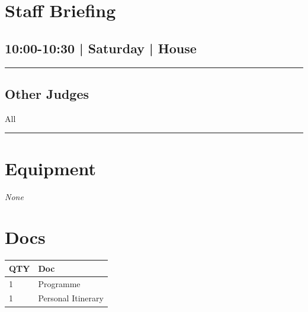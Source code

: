 \documentclass[10pt, A5]{article}
\begin{document}
        \begin{framed}
        \begin{minipage}{\textwidth}

        \setcounter{section}{3}
        \section{Staff Briefing}
        \subsection*{10:00-10:30 | Saturday | House}

        \vspace{0.25cm}
        \hrule
        \vspace{0.25cm}


        \subsection*{Other Judges}
                    All

            \vspace{0.25cm}
        \hrule
        \vspace{0.25cm}

        \begin{multicols}{2}

		\section*{\faWrench \: Equipment}

				\textit{None}
		
		\vfill\null
		\columnbreak

			\section*{\faFile \: Docs}
		 	\begin{center}
			\begin{tabular}{p{2cm}p{4cm}}

			\textbf{QTY} & \textbf{Doc} \\\toprule
										1&Programme\\\midrule
										1&Personal Itinerary\\\midrule
							\end{tabular}
			\end{center}
	

		\vfill\null

		\end{multicols}
\end{minipage}
\end{framed}
\end{document}
